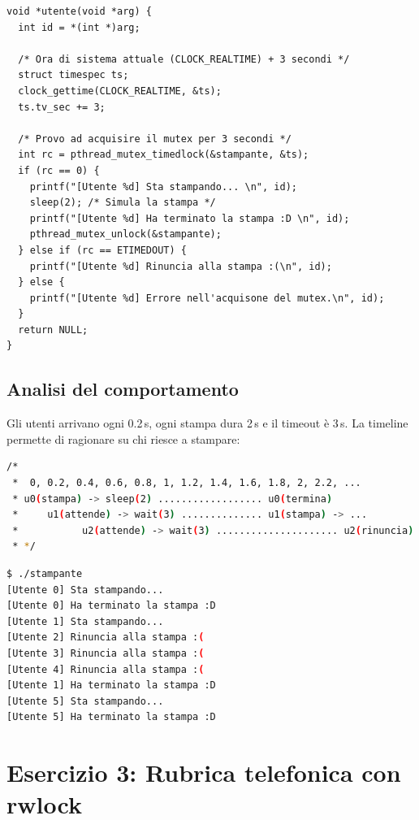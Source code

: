 \documentclass[a4paper,12pt]{article}
\begin{document}
\begin{lstlisting}[caption={Funzione utente con timeout}]
void *utente(void *arg) {
  int id = *(int *)arg;

  /* Ora di sistema attuale (CLOCK_REALTIME) + 3 secondi */
  struct timespec ts;
  clock_gettime(CLOCK_REALTIME, &ts);
  ts.tv_sec += 3;

  /* Provo ad acquisire il mutex per 3 secondi */
  int rc = pthread_mutex_timedlock(&stampante, &ts);
  if (rc == 0) {
    printf("[Utente %d] Sta stampando... \n", id);
    sleep(2); /* Simula la stampa */
    printf("[Utente %d] Ha terminato la stampa :D \n", id);
    pthread_mutex_unlock(&stampante);
  } else if (rc == ETIMEDOUT) {
    printf("[Utente %d] Rinuncia alla stampa :(\n", id);
  } else {
    printf("[Utente %d] Errore nell'acquisone del mutex.\n", id);
  }
  return NULL;
}
\end{lstlisting}

\subsection*{Analisi del comportamento}

Gli utenti arrivano ogni 0.2\,s, ogni stampa dura 2\,s e il timeout è
3\,s. La timeline permette di ragionare su chi riesce a stampare:

\begin{lstlisting}[language=bash]
/*
 *  0, 0.2, 0.4, 0.6, 0.8, 1, 1.2, 1.4, 1.6, 1.8, 2, 2.2, ...
 * u0(stampa) -> sleep(2) .................. u0(termina)
 *     u1(attende) -> wait(3) .............. u1(stampa) -> ...
 *           u2(attende) -> wait(3) ..................... u2(rinuncia)
 * */
\end{lstlisting}

\begin{lstlisting}[language=bash, caption={Test Esercizio 2 -- stampa 2s\, timeout 3s}]
$ ./stampante
[Utente 0] Sta stampando...
[Utente 0] Ha terminato la stampa :D
[Utente 1] Sta stampando...
[Utente 2] Rinuncia alla stampa :(
[Utente 3] Rinuncia alla stampa :(
[Utente 4] Rinuncia alla stampa :(
[Utente 1] Ha terminato la stampa :D
[Utente 5] Sta stampando...
[Utente 5] Ha terminato la stampa :D
\end{lstlisting}

\section{Esercizio 3: Rubrica telefonica con rwlock}
\end{document}
